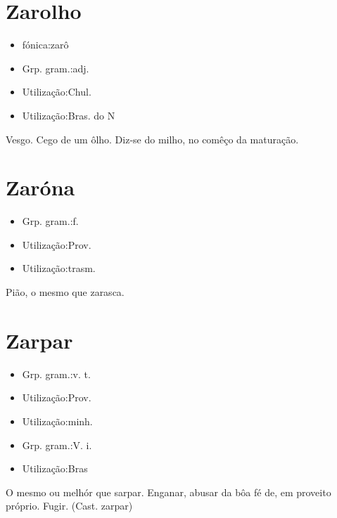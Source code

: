 \section{Zarolho}
\begin{itemize}
\item {fónica:zarô}
\end{itemize}
\begin{itemize}
\item {Grp. gram.:adj.}
\end{itemize}
\begin{itemize}
\item {Utilização:Chul.}
\end{itemize}
\begin{itemize}
\item {Utilização:Bras. do N}
\end{itemize}
Vesgo.
Cego de um ôlho.
Diz-se do milho, no comêço da maturação.
\section{Zaróna}
\begin{itemize}
\item {Grp. gram.:f.}
\end{itemize}
\begin{itemize}
\item {Utilização:Prov.}
\end{itemize}
\begin{itemize}
\item {Utilização:trasm.}
\end{itemize}
Pião, o mesmo que \textunderscore zarasca\textunderscore .
\section{Zarpar}
\begin{itemize}
\item {Grp. gram.:v. t.}
\end{itemize}
\begin{itemize}
\item {Utilização:Prov.}
\end{itemize}
\begin{itemize}
\item {Utilização:minh.}
\end{itemize}
\begin{itemize}
\item {Grp. gram.:V. i.}
\end{itemize}
\begin{itemize}
\item {Utilização:Bras}
\end{itemize}
O mesmo ou melhór que \textunderscore sarpar\textunderscore .
Enganar, abusar da bôa fé de, em proveito próprio.
Fugir.
(Cast. \textunderscore zarpar\textunderscore )
